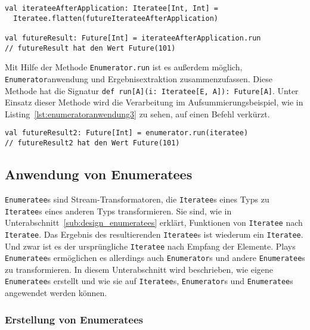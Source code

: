 \begin{lstlisting}[caption=Extrahierung des Ergebnisses aus einem Iteratee, label=lst:enumeratoranwendung2]
val iterateeAfterApplication: Iteratee[Int, Int] =
  Iteratee.flatten(futureIterateeAfterApplication)

val futureResult: Future[Int] = iterateeAfterApplication.run
// futureResult hat den Wert Future(101)
\end{lstlisting}

Mit Hilfe der Methode \lstinline|Enumerator.run| ist es außerdem möglich, \lstinline|Enumerator|anwendung und Ergebnisextraktion zusammenzufassen.
Diese Methode hat die Signatur \lstinline[breaklines=true]|def run[A](i: Iteratee[E, A]): Future[A]|.
Unter Einsatz dieser Methode wird die Verarbeitung im Aufsummierungsbeispiel, wie in Listing~\ref{lst:enumeratoranwendung3} zu sehen, auf einen Befehl verkürzt.

\begin{lstlisting}[caption=Anwendung eines Enumerators mit gleichzeitiger Ergebnisextrahierung, label=lst:enumeratoranwendung3]
val futureResult2: Future[Int] = enumerator.run(iteratee)
// futureResult2 hat den Wert Future(101)
\end{lstlisting}




\subsection{Anwendung von Enumeratees} %
\label{sub:enumeratees}

\lstinline|Enumeratee|s sind Stream-Transformatoren, die \lstinline|Iteratee|s eines Typs zu \lstinline|Iteratee|s eines anderen Typs transformieren.
Sie sind, wie in Unterabschnitt~\ref{sub:design_enumeratees} erklärt, Funktionen von \lstinline|Iteratee| nach \lstinline|Iteratee|.
Das Ergebnis des resultierenden \lstinline|Iteratee|s ist wiederum ein \lstinline|Iteratee|.
Und zwar ist es der ursprüngliche \lstinline|Iteratee| nach Empfang der Elemente.
Plays \lstinline|Enumeratee|s ermöglichen es allerdings auch \lstinline|Enumerator|s und andere \lstinline|Enumeratee|s zu transformieren.
In diesem Unterabschnitt wird beschrieben, wie eigene \lstinline|Enumeratee|s erstellt und wie sie auf \lstinline|Iteratee|s, \lstinline|Enumerator|s und \lstinline|Enumeratee|s angewendet werden können.

\subsubsection{Erstellung von Enumeratees} %
\label{ssub:erstellung_von_enumeratees}

